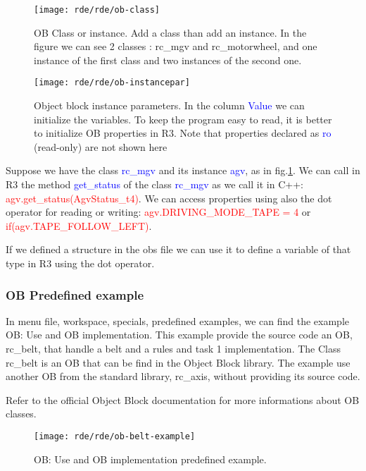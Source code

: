 \begin{figure}[h]
	\centering\texttt{[image: rde/rde/ob-class]}
	\caption{OB Class or instance. Add a class than add an instance. In the figure we can see 2 classes : rc\_mgv and rc\_motorwheel, and one instance of the first class and two instances of the second one.}
	\label{fig:obclass}
\end{figure}

\begin{figure}[h]
	\centering\texttt{[image: rde/rde/ob-instancepar]}
	\caption{Object block instance parameters. In the column \textcolor{blue}{Value} we can initialize the variables. To keep the program easy to read, it is better to initialize OB properties in R3. Note that properties declared as \textcolor{blue}{ro} (read-only) are not shown here}
	\label{fig:obinstancepar}
\end{figure}

Suppose we have the class \textcolor{blue}{rc\_mgv} and its instance \textcolor{blue}{agv}, as in fig.\ref{fig:obclass}. We can call in R3 the method \textcolor{blue}{get\_status} of the class \textcolor{blue}{rc\_mgv} as we call it in C++: \textcolor{red}{agv.get\_status(AgvStatus\_t4)}. We can access properties using also the dot operator for reading or writing: \textcolor{red}{agv.DRIVING\_MODE\_TAPE = 4} or \textcolor{red}{if(agv.TAPE\_FOLLOW\_LEFT)}.

If we defined a structure in the obs file we can use it to define a variable of that type in R3 using the dot operator.

%	
\subsubsection{OB Predefined example}
In menu file, workspace, specials, predefined examples, we can find the example OB: Use and OB implementation. This example provide the source code an OB, rc\_belt, that handle a belt and a rules and task 1 implementation.
The Class rc\_belt is an OB that can be find in the Object Block library. The example use another OB from the standard library, rc\_axis, without providing its source code.

Refer to the official Object Block documentation for more informations about OB classes.

\begin{figure}[h]
	\centering\texttt{[image: rde/rde/ob-belt-example]}
	\caption{OB: Use and OB implementation predefined example.}
	\label{fig:obbeltexample}
\end{figure}

